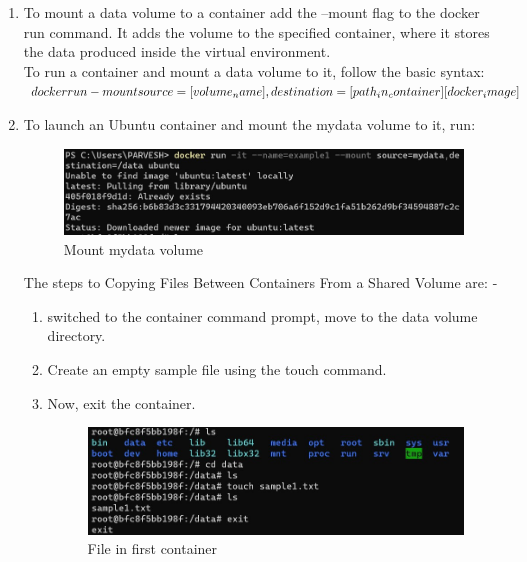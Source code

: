 \documentclass[12pt]{article}
\begin{document}
\begin{enumerate}
\item To mount a data volume to a container add the --mount flag to the docker run command. It adds the volume to the specified container, where it stores the data produced inside the virtual environment. \\

To run a container and mount a data volume to it, follow the basic syntax:\\

$ docker run \--mount  source=[volume_name],destination=[path_in_container] [docker_image]$

\item  To launch an Ubuntu container and mount the mydata volume to it, run:\\

\begin{figure}[H]
\centering
\includegraphics[scale=0.6]{fig46}
\caption{Mount mydata volume }
\vspace{0.6\baselineskip}
\end{figure}

The steps to Copying Files Between Containers From a Shared Volume are: -

\begin{enumerate}
\item  switched to the container command prompt, move to the data volume directory.

\item Create an empty sample file using the touch command.

\item Now, exit the container.

\begin{figure}[H]
\centering
\includegraphics[scale=0.6]{fig47}
\caption{File in first container}
\vspace{0.6\baselineskip}
\end{figure}


\end{enumerate}
\end{enumerate}
\end{document}
